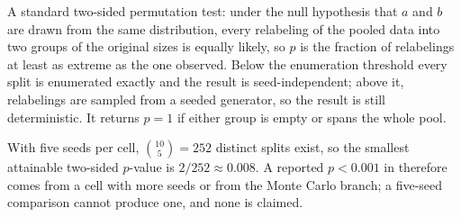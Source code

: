 A standard two-sided permutation test: under the null hypothesis that $a$ and
$b$ are drawn from the same distribution, every relabeling of the pooled data
into two groups of the original sizes is equally likely, so $p$ is the fraction
of relabelings at least as extreme as the one observed. Below the enumeration
threshold every split is enumerated exactly and the result is
seed-independent; above it, relabelings are sampled from a seeded generator, so
the result is still deterministic. It returns $p = 1$ if either group is empty
or spans the whole pool.

\begin{caveat}
With five seeds per cell, $\binom{10}{5} = 252$ distinct splits exist, so the
smallest attainable two-sided $p$-value is $2/252 \approx 0.008$. A reported
$p < 0.001$ in  therefore comes from a cell with more seeds
or from the Monte Carlo branch; a five-seed comparison cannot produce one, and
none is claimed.
\end{caveat}
